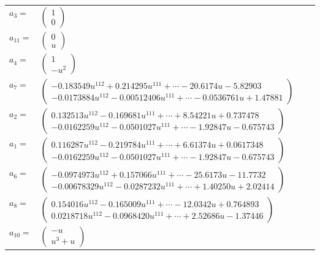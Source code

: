 \documentclass[1p]{elsarticle_modified}
\theoremstyle{definition}
\begin{document}
\begin{tabular}{m{7pt} m{180pt} m{7pt} m{180pt} }
\flushright $a_{3}=$&$\begin{pmatrix}1\\0\end{pmatrix}$ \\
\flushright $a_{11}=$&$\begin{pmatrix}0\\u\end{pmatrix}$ \\
\flushright $a_{4}=$&$\begin{pmatrix}1\\- u^2\end{pmatrix}$ \\
\flushright $a_{7}=$&$\begin{pmatrix}-0.183549 u^{112}+0.214295 u^{111}+\cdots-20.6174 u-5.82903\\-0.0173884 u^{112}-0.00512406 u^{111}+\cdots-0.0536761 u+1.47881\end{pmatrix}$ \\
\flushright $a_{2}=$&$\begin{pmatrix}0.132513 u^{112}-0.169681 u^{111}+\cdots+8.54221 u+0.737478\\-0.0162259 u^{112}-0.0501027 u^{111}+\cdots-1.92847 u-0.675743\end{pmatrix}$ \\
\flushright $a_{1}=$&$\begin{pmatrix}0.116287 u^{112}-0.219784 u^{111}+\cdots+6.61374 u+0.0617348\\-0.0162259 u^{112}-0.0501027 u^{111}+\cdots-1.92847 u-0.675743\end{pmatrix}$ \\
\flushright $a_{6}=$&$\begin{pmatrix}-0.0974973 u^{112}+0.157066 u^{111}+\cdots-25.6173 u-11.7732\\-0.00678329 u^{112}-0.0287232 u^{111}+\cdots+1.40250 u+2.02414\end{pmatrix}$ \\
\flushright $a_{8}=$&$\begin{pmatrix}0.154016 u^{112}-0.165009 u^{111}+\cdots-12.0342 u+0.764893\\0.0218718 u^{112}-0.0968420 u^{111}+\cdots+2.52686 u-1.37446\end{pmatrix}$ \\
\flushright $a_{10}=$&$\begin{pmatrix}- u\\u^3+u\end{pmatrix}$ \\

\end{tabular}
\end{document}
